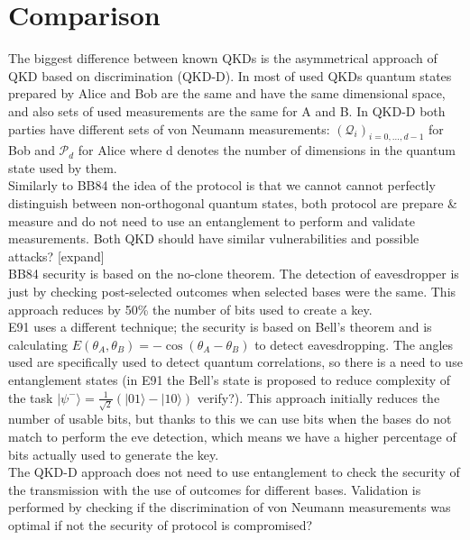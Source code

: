 \documentclass[12pt,a4paper]{article}
\begin{document}
\section{Comparison}
The biggest difference between known QKDs is the asymmetrical approach of QKD based on discrimination (QKD-D). In most of used QKDs quantum states prepared by Alice and Bob are the same and have the same dimensional space, and also sets of used measurements are the same for A and B. In QKD-D both parties have different sets of von Neumann measurements: $(\mathcal{Q}_i)_{i=0,\dots,d-1}$ for Bob and $\mathcal{P}_d$ for Alice where d denotes the number of dimensions in the quantum state used by them. 
\\Similarly to BB84 the idea of the protocol is that we cannot cannot perfectly distinguish between non-orthogonal quantum states, both protocol are prepare \& measure and do not need to use an entanglement to perform and validate measurements. Both QKD should have similar vulnerabilities and possible attacks? [expand] \\ 
BB84 security is based on the no-clone theorem. The detection of eavesdropper is just by checking post-selected outcomes when selected bases were the same. This approach reduces by 50\% the number of bits used to create a key. \\
E91 uses a different technique; the security is based on Bell's theorem and is calculating $E(\theta_A, \theta_B) = -\cos(\theta_A - \theta_B)$ to detect eavesdropping. The angles used are specifically used to detect quantum correlations, so there is a need to use entanglement states (in E91 the Bell's state is proposed to reduce complexity of the task $|\psi^-\rangle = \frac{1}{\sqrt{2}} (|01\rangle - |10\rangle)$ verify?). This approach initially reduces the number of usable bits, but thanks to this we can use bits when the bases do not match to perform the eve detection, which means we have a higher percentage of bits actually used to generate the key. \\
The QKD-D approach does not need to use entanglement to check the security of the transmission with the use of outcomes for different bases. Validation is performed by checking if the discrimination of von Neumann measurements was optimal if not the security of protocol is compromised?
\end{document}
